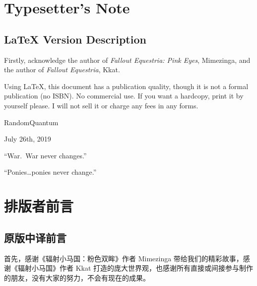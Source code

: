 
\chapter{Typesetter's Note}

\pagestyle{english}


\section*{\LaTeX{} Version Description}

{\englinespread

Firstly, acknowledge the author of \emph{Fallout Equestria: Pink Eyes}, Mimezinga, and the author of \emph{Fallout Equestria}, Kkat.

Using \LaTeX{}, this document has a publication quality, though it is not a formal publication (no ISBN). No commercial use. If you want a hardcopy, print it by yourself please. I will not sell it or charge any fees in any forms.

\begin{flushright}
RandomQuantum

July 26th, 2019
\end{flushright}

}

\clearpage

\begin{motto}
``War. War never changes.''

\medskip

``Ponies\dots ponies never change.''
\end{motto}




\chapter{排版者前言}

\pagestyle{chinese}

\section*{原版中译前言}

首先，感谢《辐射小马国：粉色双眸》作者 Mimezinga 带给我们的精彩故事，感谢《辐射小马国》作者 Kkat 打造的庞大世界观，也感谢所有直接或间接参与制作的朋友，没有大家的努力，不会有现在的成果。

